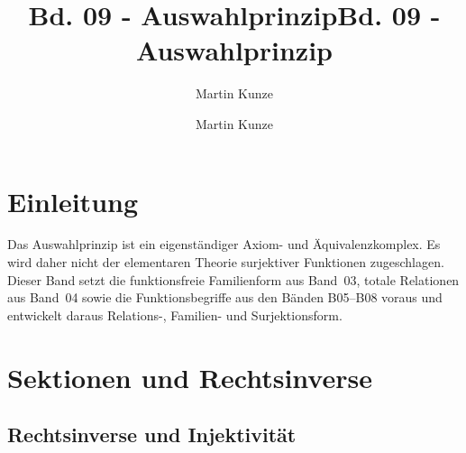 \documentclass[main.tex]{subfiles}
\title{Bd. 09 - Auswahlprinzip}
\author{Martin Kunze}
\date{}
\begin{document}
\title{Bd. 09 - Auswahlprinzip}
\author{Martin Kunze}
\date{}
\hypersetup{pageanchor=false}
\maketitle
\hypersetup{pageanchor=true}
\setcounter{tocdepth}{3}
\tableofcontents
\setcounter{file}{9}
\renewcommand{\FormulaBandID}{9}

\chapter{Einleitung}

Das Auswahlprinzip ist ein eigenständiger Axiom- und Äquivalenzkomplex. Es
wird daher nicht der elementaren Theorie surjektiver Funktionen zugeschlagen.
Dieser Band setzt die funktionsfreie Familienform aus Band~03, totale
Relationen aus Band~04 sowie die Funktionsbegriffe aus den Bänden B05--B08
voraus und entwickelt daraus Relations-, Familien- und Surjektionsform.

\chapter{Sektionen und Rechtsinverse}

\section{Rechtsinverse und Injektivität}

\begin{tabproofwide}











\end{tabproofwide}
\end{document}
